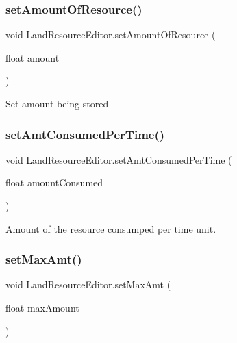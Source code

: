 \subsubsection{\texorpdfstring{set\+Amount\+Of\+Resource()}{setAmountOfResource()}}
{\footnotesize\ttfamily void Land\+Resource\+Editor.\+set\+Amount\+Of\+Resource (\begin{DoxyParamCaption}\item[{float}]{amount }\end{DoxyParamCaption})}



Set amount being stored 

\mbox{\label{class_land_resource_editor_a5d3bfebc77d458924048d2ce42c25c55}} 
\subsubsection{\texorpdfstring{set\+Amt\+Consumed\+Per\+Time()}{setAmtConsumedPerTime()}}
{\footnotesize\ttfamily void Land\+Resource\+Editor.\+set\+Amt\+Consumed\+Per\+Time (\begin{DoxyParamCaption}\item[{float}]{amount\+Consumed }\end{DoxyParamCaption})}



Amount of the resource consumped per time unit. 

\mbox{\label{class_land_resource_editor_a7f7cf4e6c7dacb9028a155dae2428e71}} 
\subsubsection{\texorpdfstring{set\+Max\+Amt()}{setMaxAmt()}}
{\footnotesize\ttfamily void Land\+Resource\+Editor.\+set\+Max\+Amt (\begin{DoxyParamCaption}\item[{float}]{max\+Amount }\end{DoxyParamCaption})}




